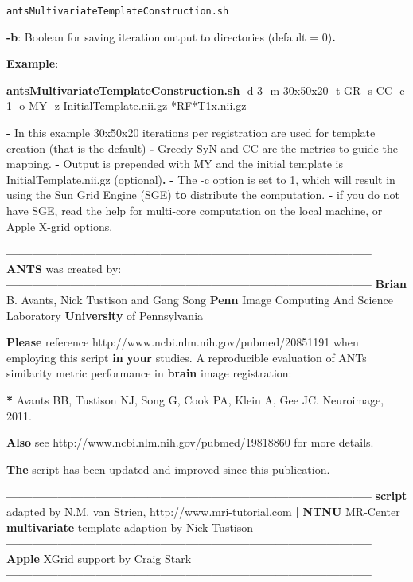 \documentclass[ignorenonframetext,]{beamer}
\newenvironment{Shaded}{\begin{snugshade}}{\end{snugshade}}
\newcommand{\KeywordTok}[1]{\textcolor[rgb]{0.13,0.29,0.53}{\textbf{{#1}}}}
\newcommand{\NormalTok}[1]{{#1}}
\begin{document}
\begin{frame}[fragile]{\texttt{antsMultivariateTemplateConstruction.sh}}
\begin{Shaded}
\begin{Highlighting}[]
     \KeywordTok{-b}\NormalTok{:  Boolean for saving iteration output to directories (default = 0)}\KeywordTok{.}

\KeywordTok{Example}\NormalTok{:}

\KeywordTok{antsMultivariateTemplateConstruction.sh} \NormalTok{-d 3 -m 30x50x20 -t GR -s CC -c 1 -o MY -z InitialTemplate.nii.gz  *RF*T1x.nii.gz}

\KeywordTok{-} \NormalTok{In this example 30x50x20 iterations per registration are used for template creation (that is the default)}
\KeywordTok{-} \NormalTok{Greedy-SyN and CC are the metrics to guide the mapping.}
\KeywordTok{-} \NormalTok{Output is prepended with MY and the initial template is InitialTemplate.nii.gz (optional)}\KeywordTok{.}
\KeywordTok{-} \NormalTok{The -c option is set to 1, which will result in using the Sun Grid Engine (SGE) }\KeywordTok{to} \NormalTok{distribute the computation.}
\KeywordTok{-} \NormalTok{if you do not have SGE, read the help for multi-core computation on the local machine, or Apple X-grid options.}

\KeywordTok{--------------------------------------------------------------------------------------}
\KeywordTok{ANTS} \NormalTok{was created by:}
\KeywordTok{--------------------------------------------------------------------------------------}
\KeywordTok{Brian} \NormalTok{B. Avants, Nick Tustison and Gang Song}
\KeywordTok{Penn} \NormalTok{Image Computing And Science Laboratory}
\KeywordTok{University} \NormalTok{of Pennsylvania}

\KeywordTok{Please} \NormalTok{reference http://www.ncbi.nlm.nih.gov/pubmed/20851191 when employing this script}
\KeywordTok{in} \KeywordTok{your} \NormalTok{studies. A reproducible evaluation of ANTs similarity metric performance in}
\KeywordTok{brain} \NormalTok{image registration:}

\KeywordTok{*} \NormalTok{Avants BB, Tustison NJ, Song G, Cook PA, Klein A, Gee JC. Neuroimage, 2011.}

\KeywordTok{Also} \NormalTok{see http://www.ncbi.nlm.nih.gov/pubmed/19818860 for more details.}

\KeywordTok{The} \NormalTok{script has been updated and improved since this publication.}

\KeywordTok{--------------------------------------------------------------------------------------}
\KeywordTok{script} \NormalTok{adapted by N.M. van Strien, http://www.mri-tutorial.com }\KeywordTok{|} \KeywordTok{NTNU} \NormalTok{MR-Center}
\KeywordTok{multivariate} \NormalTok{template adaption by Nick Tustison}
\KeywordTok{--------------------------------------------------------------------------------------}
\KeywordTok{Apple} \NormalTok{XGrid support by Craig Stark}
\KeywordTok{--------------------------------------------------------------------------------------}
\end{Highlighting}
\end{Shaded}

\end{frame}
\end{document}
